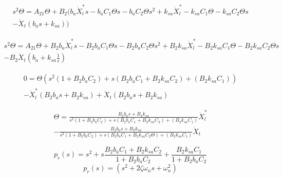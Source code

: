 \documentclass{article}
\begin{document}
            \begin{equation}
                \begin{split}
                s^2 \Theta = A_{21} \Theta + B_{2}\biggl(  b_a \dot{X}_l^* s- b_a C_1 \Theta s-b_a  C_2 \Theta s^2 + k_{sa}\dot{X}_l^* - k_{sa} C_1 \Theta - k_{sa} C_2 \Theta s\\
                - \dot{X}_t\left(b_a s+k_{sa}\right)\biggr)
                \end{split}
            \end{equation}

            \begin{equation}
                \begin{split}
                s^2 \Theta = A_{21} \Theta + B_{2}b_a\dot{X}_l^* s - B_{2}b_a C_1 \Theta s-B_{2}b_a C_2 \Theta s^2 + B_{2}k_{sa}\dot{X}_l^* - B_{2}k_{sa} C_1 \Theta  - B_{2}k_{sa} C_2 \Theta s\\
                - B_{2}\dot{X}_t\left(b_a+k_{sa}\frac{1}{s}\right)
                \end{split}
            \end{equation}

            \begin{equation}
                \begin{split}
                0= \Theta \left( s^2 \left(1+B_{2}b_a C_2\right) + s \left( B_{2}b_a C_1 +B_{2}k_{sa} C_2 \right) + \left( B_{2}k_{sa} C_1 \right) \right)\\
                - \dot{X}_l^*\left(B_{2}b_a s + B_{2}k_{sa}\right) +\dot{X}_t\left(B_{2}b_a s+B_{2}k_{sa}\right)
                \end{split}
            \end{equation}


            \begin{equation}
                \begin{split}
                    \Theta= \frac{B_{2}b_a s + B_{2}k_{sa}}{ s^2 \left(1+B_{2}b_a C_2\right) + s \left( B_{2}b_a C_1 +B_{2}k_{sa} C_2 \right) + \left( B_{2}k_{sa} C_1 \right)} \dot{X}_l^*\\
                    - \frac{B_{2}b_a s+B_{2}k_{sa}}{ s^2 \left(1+B_{2}b_a C_2\right) + s \left( B_{2}b_a C_1 +B_{2}k_{sa} C_2 \Theta \right) + \left( B_{2}k_{sa} C_1 \right)} \dot{X}_t
                \end{split}
            \end{equation}

            \begin{equation}
                p_r(s)=s^2 + s \frac{B_{2}b_a C_1 +B_{2}k_{sa} C_2 }{1+B_{2}b_a C_2} + \frac{B_{2}k_{sa} C_1}{1+B_{2}b_a C_2}
            \end{equation}
            \begin{equation}
                p_r(s)=(s^2+2\zeta\omega_n s+\omega_n^2)
            \end{equation}
\end{document}
